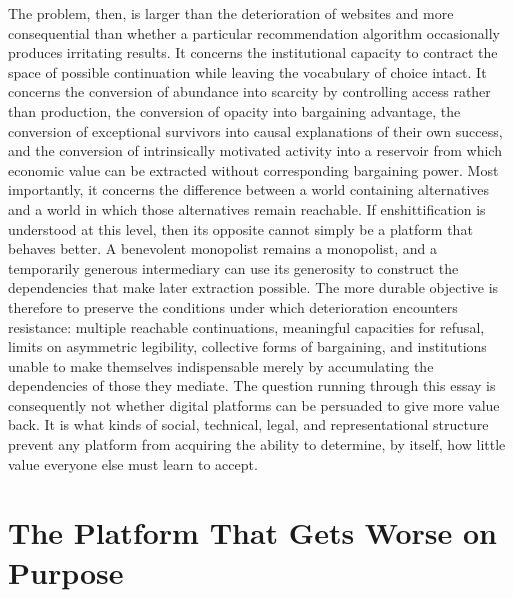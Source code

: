 \documentclass[11pt]{article}
\begin{document}
The problem, then, is larger than the deterioration of websites and more consequential than whether a particular recommendation algorithm occasionally produces irritating results. It concerns the institutional capacity to contract the space of possible continuation while leaving the vocabulary of choice intact. It concerns the conversion of abundance into scarcity by controlling access rather than production, the conversion of opacity into bargaining advantage, the conversion of exceptional survivors into causal explanations of their own success, and the conversion of intrinsically motivated activity into a reservoir from which economic value can be extracted without corresponding bargaining power. Most importantly, it concerns the difference between a world containing alternatives and a world in which those alternatives remain reachable. If enshittification is understood at this level, then its opposite cannot simply be a platform that behaves better. A benevolent monopolist remains a monopolist, and a temporarily generous intermediary can use its generosity to construct the dependencies that make later extraction possible. The more durable objective is therefore to preserve the conditions under which deterioration encounters resistance: multiple reachable continuations, meaningful capacities for refusal, limits on asymmetric legibility, collective forms of bargaining, and institutions unable to make themselves indispensable merely by accumulating the dependencies of those they mediate. The question running through this essay is consequently not whether digital platforms can be persuaded to give more value back. It is what kinds of social, technical, legal, and representational structure prevent any platform from acquiring the ability to determine, by itself, how little value everyone else must learn to accept.

\section{The Platform That Gets Worse on Purpose}
\end{document}
